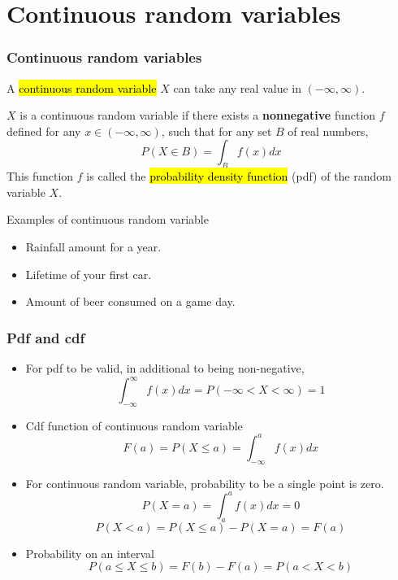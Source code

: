 \documentclass[slidestop,compress,mathserif]{beamer}
\begin{document}
\section{Continuous random variables}
\begin{frame}\frametitle{Continuous random variables}

\begin{dinglist}{\DingListSymbolA}
\item A \hl{continuous random variable} $X$ can take any real value in $(-\infty, \infty)$.
\end{dinglist}

\begin{defn}
$X$ is a continuous random variable if there exists a {\bf nonnegative} function $f$
defined for any $x \in (-\infty, \infty)$, such that for any set $B$ of real numbers,
\[ P(X \in B) = \int_B f(x) dx \]
This function $f$ is called the \hl{probability density function} (pdf) of the random variable $X$.
\end{defn}

\vspace{0.5cm}


Examples of continuous random variable
\begin{itemize}
\item Rainfall amount for a year.\\
\item Lifetime of your first car. \\
\item Amount of beer consumed on a game day.
\end{itemize}

\end{frame}

\begin{frame}\frametitle{Pdf and cdf}

\begin{itemize}

\item  For pdf to be valid, in additional to being non-negative,
\[  \int_{-\infty}^{\infty} f(x) dx = P(-\infty < X < \infty) =  1\] 

\item Cdf function of continuous random variable
\[ F(a) = P(X \leq a) =  \int_{-\infty}^{a} f(x) dx \]
\vspace{-0.5cm}

\item  For continuous random variable, probability to be a single point is zero.
\[ P(X = a) =   \int_{a}^{a} f(x) dx = 0\]
\[ P(X < a) = P(X \leq a) - P(X = a) = F(a) \]
\vspace{-0.5cm}

\item Probability on an interval
\[ P( a \leq X \leq b) =  F(b) - F(a) = P(a < X < b)\]


\end{itemize}

\end{frame}
\end{document}
